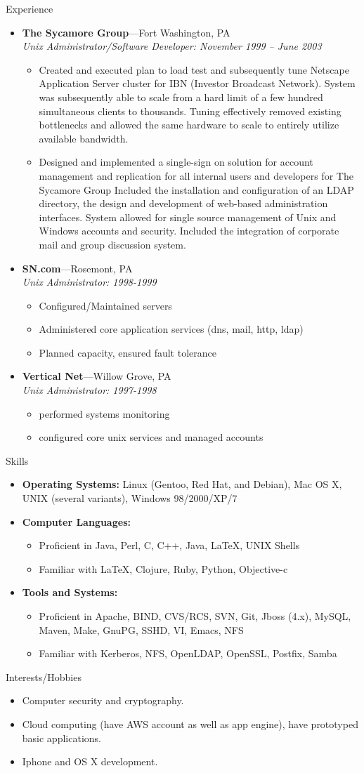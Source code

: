 \documentclass[11pt,oneside]{article}
\newenvironment{ressection}[1]{
	\vspace{4pt}
	{\fontfamily{phv}\selectfont\Large#1}
	\begin{itemize}
	\vspace{3pt}
}{
	\end{itemize}
}
\newcommand{\resitem}[1]{
	\vspace{-4pt}
	\item \begin{flushleft} #1 \end{flushleft}
}
\newcommand{\ressubitem}[1]{
	\vspace{-1pt}
	\item \begin{flushleft} #1 \end{flushleft}
}
\newcommand{\resbigitem}[3]{
	\vspace{-5pt}
	\item
	\textbf{#1}---#2 \\
	\textit{#3}
}
\newenvironment{ressubsec}[3]{
	\resbigitem{#1}{#2}{#3}
	\vspace{-2pt}
	\begin{itemize}
}{
	\end{itemize}
}
\newenvironment{reslist}[1]{
	\resitem{\textbf{#1}}
	\vspace{-5pt}
	\begin{itemize}
}{
	\end{itemize}
}
\begin{document}
\begin{ressection}{Experience}
\begin{ressubsec}{The Sycamore Group}{Fort Washington, PA}{Unix Administrator/Software Developer: November 1999 -- June 2003}
	        \ressubitem{Created and executed plan to load test and subsequently tune Netscape Application Server cluster for IBN (Investor Broadcast Network). System was subsequently able to scale from a hard limit of a few hundred simultaneous clients to thousands. Tuning effectively removed existing bottlenecks and allowed the same hardware to scale to entirely utilize available bandwidth. }
	        \ressubitem{Designed and implemented a single-sign on solution for account management and replication for all internal users and developers for The Sycamore Group Included the installation and configuration of an LDAP directory, the design and development of web-based administration interfaces. System allowed for single source management of Unix and Windows accounts and security. Included the integration of corporate mail and group discussion system. }
    \end{ressubsec}
	\begin{ressubsec}{SN.com}{Rosemont, PA}{Unix Administrator: 1998-1999}
		\ressubitem{Configured/Maintained servers}
		\ressubitem{Administered core application services (dns, mail, http, ldap)}
		\ressubitem{Planned capacity, ensured fault tolerance}
	\end{ressubsec}
	\begin{ressubsec}{Vertical Net}{Willow Grove, PA}{Unix Administrator: 1997-1998}
		\ressubitem{performed systems monitoring}
		\ressubitem{configured core unix services and managed accounts}
	\end{ressubsec}
\end{ressection}


\begin{ressection}{Skills}

	\resitem{\textbf{Operating Systems:} Linux (Gentoo, Red Hat, and Debian), Mac OS X, UNIX (several variants), Windows 98/2000/XP/7}

	\begin{reslist}{Computer Languages:}

		\ressubitem{Proficient in Java, Perl, C, C++, Java, \LaTeX, UNIX Shells}

		\ressubitem{Familiar with \LaTeX, Clojure, Ruby, Python, Objective-c}

	\end{reslist}

	\begin{reslist}{Tools and Systems:}

		\ressubitem{Proficient in Apache, BIND, CVS/RCS, SVN, Git, Jboss (4.x), MySQL, Maven, Make, GnuPG, SSHD, VI, Emacs, NFS}

		\ressubitem{Familiar with Kerberos, NFS, OpenLDAP, OpenSSL, Postfix, Samba}

	\end{reslist}


\end{ressection}


\begin{ressection}{Interests/Hobbies}

	\resitem{Computer security and cryptography.}
	\resitem{Cloud computing (have AWS account as well as app engine), have prototyped basic applications.}
	\resitem{Iphone and OS X development.}

\end{ressection}
\end{document}
